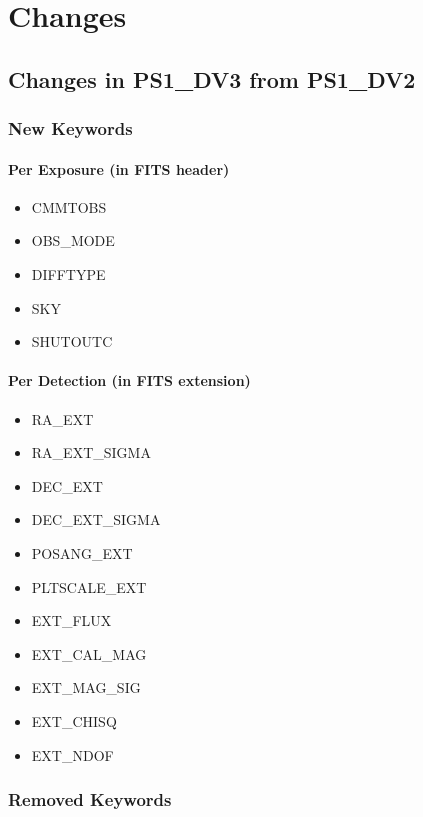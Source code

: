\documentclass[panstarrs,spec]{panstarrs}
\begin{document}
\pagebreak

\section{Changes}

\subsection{Changes in PS1\_DV3 from PS1\_DV2}

\subsubsection{New Keywords}

\paragraph{Per Exposure (in FITS header)}
\begin{itemize}
\item CMMTOBS
\item OBS\_MODE
\item DIFFTYPE
\item SKY
\item SHUTOUTC
\end{itemize}

\paragraph{Per Detection (in FITS extension)}
\begin{itemize}
\item RA\_EXT
\item RA\_EXT\_SIGMA
\item DEC\_EXT
\item DEC\_EXT\_SIGMA
\item POSANG\_EXT
\item PLTSCALE\_EXT
\item EXT\_FLUX
\item EXT\_CAL\_MAG
\item EXT\_MAG\_SIG
\item EXT\_CHISQ
\item EXT\_NDOF
\end{itemize}

\subsubsection{Removed Keywords}
\end{document}
